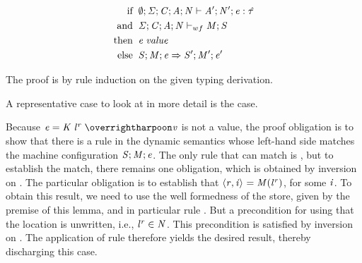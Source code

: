 \begin{lemma}[Progress]
  \label{lemma:progress_brief}
  \begin{displaymath}
  \begin{aligned}
  \text{if} \;\; & \emptyset;\mathit{\Sigma};\mathit{C};\mathit{A};\mathit{N} \vdash \mathit{A}';\mathit{N}';\mathit{e} : \mathit{\hat{\tau}} \\
  \text{and} \;\; & \mathit{\Sigma};\mathit{C};\mathit{A};\mathit{N} \vdash_{wf} \mathit{M};\mathit{S} \\
  \text{then} \;\; & \mathit{e} \; \mathit{value} \\
  \text{else} \;\; & \mathit{S};\mathit{M};\mathit{e} \Rightarrow \mathit{S}';\mathit{M}';\mathit{e}'
  \end{aligned}
  \end{displaymath}
\end{lemma}
\begin{nproof}
  The proof is by rule induction on the given typing derivation.

  A representative case to look at in more detail is the \tdatacon{} case.

    Because $\EXPR = \datacon{\DC}{\keywd{\locreg{\loc}{\reg}}}{\overharpoon{\VAL}}$ is not
    a value, the proof obligation is to show that there is a rule in the dynamic semantics whose
    left-hand side matches the machine configuration $\mathit{S};\mathit{M};\mathit{e}$.
    The only rule that can match is \ddatacon{}, but to establish the
    match, there remains one obligation, which is obtained
    by inversion on \ddatacon{}.
    The particular obligation is to establish that
    $\langle \mathit{r}, \mathit{i} \rangle ^{} = \mathit{M}({\mathit{l}}^{\mathit{r}})$,
    for some $\mathit{i}$.
    To obtain this result, we need to use the well formedness
    of the store, given by the premise of this lemma, and in particular rule
    .
    But a precondition for using
     that
    the location is unwritten, i.e., ${\mathit{l}}^{\mathit{r}} \in \mathit{N}$.
    This precondition is satisfied by inversion on \tdatacon{}.
    The application of rule 
    therefore yields the desired result, thereby discharging this case.




\end{nproof}

